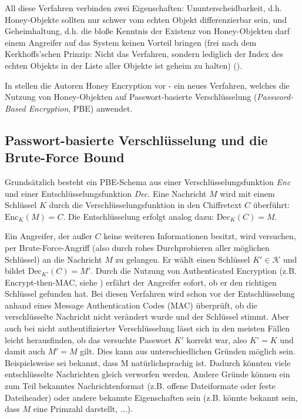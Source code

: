 All diese Verfahren verbinden zwei Eigenschaften: Ununterscheidbarkeit, d.h. Honey-Objekte sollten nur schwer vom echten Objekt differenzierbar sein, und Geheimhaltung, d.h. die bloße Kenntnis der Existenz von Honey-Objekten darf einem Angreifer auf das System keinen Vorteil bringen (frei nach dem Kerkhoffs'schen Prinzip: Nicht das Verfahren, sondern lediglich der Index des echten Objekts in der Liste aller Objekte ist geheim zu halten) (\cite{SACMAT2014}).

In \cite{EURO2014} stellen die Autoren Honey Encryption vor - ein neues Verfahren, welches die Nutzung von Honey-Objekten auf Passwort-basierte Verschlüsselung (\textit{Password-Based Encryption}, PBE) anwendet.

\subsection{Passwort-basierte Verschlüsselung und die Brute-Force Bound}

Grundsätzlich besteht ein PBE-Schema aus einer Verschlüsselungsfunktion \textit{Enc} und einer Entschlüsselungsfunktion \textit{Dec}. Eine Nachricht \(M\) wird mit einem Schlüssel \(K\) durch die Verschlüsselungsfunktion in den Chiffretext \(C\) überführt: \(\text{Enc}_K(M)=C\). Die Entschlüsselung erfolgt analog dazu: \(\text{Dec}_K(C)=M\). 

Ein Angreifer, der außer \(C\) keine weiteren Informationen besitzt, wird versuchen, per Brute-Force-Angriff (also durch rohes Durchprobieren aller möglichen Schlüssel) an die Nachricht \(M\) zu gelangen. Er wählt einen Schlüssel \(K' \in \mathcal{K}\) und bildet \(\text{Dec}_{K'}(C)=M'\). Durch die Nutzung von Authenticated Encryption (z.B. Encrypt-then-MAC, siehe \cite{AE2000}) erfährt der Angreifer sofort, ob er den richtigen Schlüssel gefunden hat. Bei diesen Verfahren wird schon vor der Entschlüsselung anhand eines Message Authentication Codes (MAC) überprüft, ob die verschlüsselte Nachricht nicht verändert wurde und der Schlüssel stimmt. Aber auch bei nicht authentifizierter Verschlüsselung lässt sich in den meisten Fällen leicht herausfinden, ob das versuchte Passwort \(K'\) korrekt war, also \(K'=K\) und damit auch \(M'=M\) gilt. Dies kann aus unterschiedlichen Gründen möglich sein. Beispielsweise sei bekannt, dass M natürlichsprachig ist. Dadurch könnten viele entschlüsselte Nachrichten gleich verworfen werden. Andere Gründe können ein zum Teil bekanntes Nachrichtenformat (z.B. offene Dateiformate oder feste Dateiheader) oder andere bekannte Eigenschaften sein (z.B. könnte bekannt sein, dass \(M\) eine Primzahl darstellt, ...). 

